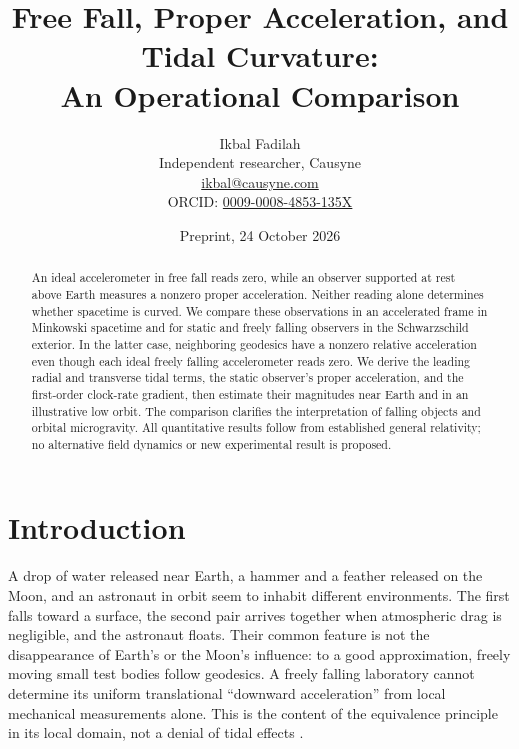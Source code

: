 \documentclass[11pt,letterpaper]{article}
\begin{document}
\title{Free Fall, Proper Acceleration, and Tidal Curvature:\\
An Operational Comparison}
\author{Ikbal Fadilah\\
\small Independent researcher, Causyne\\
\small \href{mailto:ikbal@causyne.com}{ikbal@causyne.com}\\
\small ORCID: \href{https://orcid.org/0009-0008-4853-135X}{0009-0008-4853-135X}}
\date{Preprint, 24 October 2026}

\maketitle

\begin{abstract}
An ideal accelerometer in free fall reads zero, while an observer supported at rest above Earth measures a nonzero proper acceleration. Neither reading alone determines whether spacetime is curved. We compare these observations in an accelerated frame in Minkowski spacetime and for static and freely falling observers in the Schwarzschild exterior. In the latter case, neighboring geodesics have a nonzero relative acceleration even though each ideal freely falling accelerometer reads zero. We derive the leading radial and transverse tidal terms, the static observer's proper acceleration, and the first-order clock-rate gradient, then estimate their magnitudes near Earth and in an illustrative low orbit. The comparison clarifies the interpretation of falling objects and orbital microgravity. All quantitative results follow from established general relativity; no alternative field dynamics or new experimental result is proposed.
\end{abstract}

\section{Introduction}

A drop of water released near Earth, a hammer and a feather released on the Moon, and an astronaut in orbit seem to inhabit different environments. The first falls toward a surface, the second pair arrives together when atmospheric drag is negligible, and the astronaut floats. Their common feature is not the disappearance of Earth's or the Moon's influence: to a good approximation, freely moving small test bodies follow geodesics. A freely falling laboratory cannot determine its uniform translational ``downward acceleration'' from local mechanical measurements alone. This is the content of the equivalence principle in its local domain, not a denial of tidal effects \cite{Wald,EinsteinOnline,NASAOrbit}.
\end{document}
